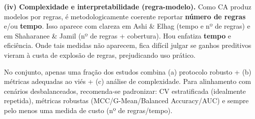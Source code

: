 \textbf{(iv) Complexidade e interpretabilidade (regra-modelo).}
Como CA produz modelos por regras, é metodologicamente coerente reportar \textbf{número de regras} e/ou \textbf{tempo}.
Isso aparece com clareza em Ashi \& Elhag \cite{ashi2021enhancing} (tempo e nº de regras) e em Shaharanee \& Jamil
\cite{shaharanee2015irrelevant} (nº de regras + cobertura). Hou \cite{hou2025improved} enfatiza \textbf{tempo} e eficiência.
Onde tais medidas não aparecem, fica difícil julgar se ganhos preditivos vieram à custa de explosão de regras, prejudicando uso prático.

No conjunto, apenas uma fração dos estudos combina (a) protocolo robusto + (b) métricas adequadas ao viés + (c) análise de
complexidade. Para alinhamento com cenários desbalanceados, recomenda-se padronizar: CV estratificada (idealmente repetida),
métricas robustas (MCC/G-Mean/Balanced Accuracy/AUC) e sempre pelo menos uma medida de custo (nº de regras/tempo).
